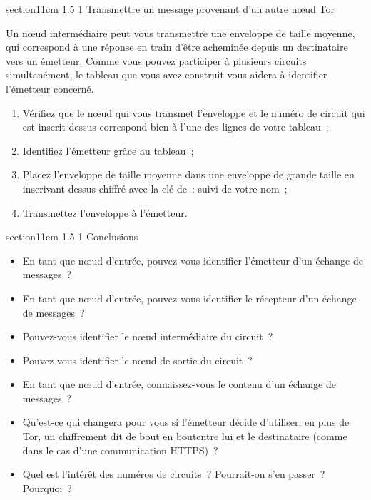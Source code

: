 \documentclass[a4paper,twoside,french]{article}
\makeatletter
\renewcommand\section{\@startsection
  {section}{1}{1cm}%
  {1.5\baselineskip}%
  {1\baselineskip}%
  {\normalfont\Large\bfseries}}%
\makeatother
\begin{document}
  \section{Transmettre un message provenant d'un autre n\oe ud Tor}

  Un n\oe ud intermédiaire peut vous transmettre une enveloppe de
  taille moyenne, qui correspond à une réponse en train d'être
  acheminée depuis un destinataire vers un émetteur. Comme vous pouvez
  participer à plusieurs circuits simultanément, le tableau que vous
  avez construit vous aidera à identifier l'émetteur concerné.

  \begin{enumerate}
  \item Vérifiez que le n\oe ud qui vous transmet l'enveloppe et le
    numéro de circuit qui est inscrit dessus correspond bien à l'une
    des lignes de votre tableau~;
  \item Identifiez l'émetteur grâce au tableau~;
  \item Placez l'enveloppe de taille moyenne dans une enveloppe de
    grande taille en inscrivant dessus \og chiffré avec la clé de~:
    \fg suivi de votre nom~;
  \item Transmettez l'enveloppe à l'émetteur.
  \end{enumerate}

  \section{Conclusions}

  \begin{itemize}
  \item En tant que n\oe ud d'entrée, pouvez-vous identifier
    l'émetteur d'un échange de messages~?
  \item En tant que n\oe ud d'entrée, pouvez-vous identifier
    le récepteur d'un échange de messages~?
  \item Pouvez-vous identifier le n\oe ud intermédiaire du circuit~?
  \item Pouvez-vous identifier le n\oe ud de sortie du circuit~?
  \item En tant que n\oe ud d'entrée, connaissez-vous le contenu d'un
    échange de messages~?
  \item Qu'est-ce qui changera pour vous si l'émetteur décide
    d'utiliser, en plus de Tor, un chiffrement dit \og de bout en
    bout\fg entre lui et le destinataire (comme dans le cas d'une
    communication HTTPS)~?
  \item Quel est l'intérêt des numéros de circuits~? Pourrait-on s'en
    passer~? Pourquoi~?
  \end{itemize}

  
		
\end{document}
